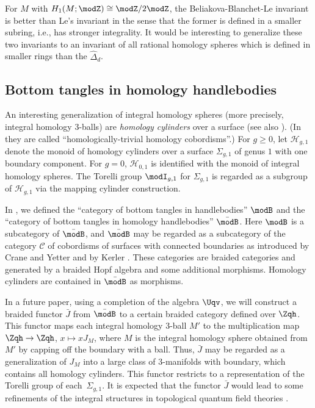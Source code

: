 \documentclass{amsart}
\numberwithin{equation}{section}
\numberwithin{figure}{section}
\theoremstyle{plain}
\theoremstyle{definition}
\theoremstyle{remark}
\begin{document}
For $M$ with $H_1(M;\modZ )\cong\modZ /2\modZ $, the Beliakova-Blanchet-Le
invariant is better than Le's invariant in the sense that the former
is defined in a smaller subring, i.e., has stronger integrality.  It
would be interesting to generalize these two invariants to an
invariant of all rational homology spheres which is defined in smaller
rings than the $\hat\Delta _d$.

\subsection{Bottom tangles in homology handlebodies}
\label{sec:homology-cylinders}

An interesting generalization of integral homology spheres (more
precisely, integral homology $3$-balls) are {\em homology cylinders}
over a surface \cite{Goussarov,H:claspers} (see also
\cite{Garoufalidis-Levine,Habegger}).  (In \cite{H:claspers} they are
called ``homologically-trivial homology cobordisms''.)  For $g\ge 0$,
let ${\mathcal H}_{g,1}$ denote the monoid of homology cylinders over
a surface $\Sigma _{g,1}$ of genus $1$ with one boundary component.  For
$g=0$, ${\mathcal H}_{0,1}$ is identified with the monoid of integral
homology spheres.  The Torelli group $\modI _{g,1}$ for $\Sigma _{g,1}$ is
regarded as a subgroup of ${\mathcal H}_{g,1}$ via the mapping
cylinder construction.

In \cite[Section 14.5]{H:universal}, we defined the ``category of
bottom tangles in handlebodies'' $\modB $ and the ``category of bottom
tangles in homology handlebodies'' $\bar\modB $.  Here $\modB $ is a
subcategory of $\bar\modB $, and $\bar\modB $ may be regarded as a
subcategory of the category $\mathcal C$ of cobordisms of surfaces with
connected boundaries as introduced by Crane and Yetter
\cite{Crane-Yetter} and by Kerler \cite{Kerler:99}.  These categories
are braided categories and generated by a braided Hopf algebra and
some additional morphisms.  Homology cylinders are contained in
$\bar\modB $ as morphisms.

In a future paper, using a completion of the algebra $\Uqv$, we will
construct a braided functor $\bar J$ from $\bar\modB $ to a certain
braided category defined over $\Zqh$.  This functor maps each integral
homology $3$-ball $M'$ to the multiplication map $\Zqh\rightarrow \Zqh$,
$x\mapsto xJ_M$, where $M$ is the integral homology sphere obtained
from $M'$ by capping off the boundary with a ball.  Thus, $\bar J$ may
be regarded as a generalization of $J_M$ into a large class of
$3$-manifolds with boundary, which contains all homology cylinders.
This functor restricts to a representation of the Torelli group of
each~$\Sigma _{g,1}$.  It is expected that the functor $\bar J$ would lead
to some refinements of the integral structures in topological quantum
field theories \cite{Gilmer,GMW,GM}.
\end{document}
